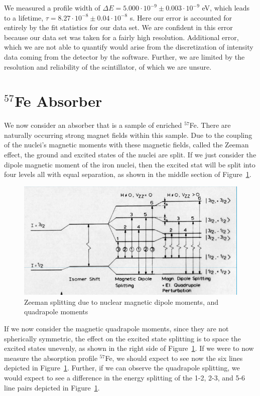 \documentclass[paper=a4, fontsize=11pt, abstract=on]{scrartcl} %
\numberwithin{equation}{section}
\numberwithin{figure}{section}
\numberwithin{table}{section}
\begin{document}
We measured a profile width of $\Delta E = 5.000 \cdot 10^{-9} \pm 0.003 \cdot 10^{-9}$ eV, which
leads to a lifetime, $\tau = 8.27 \cdot 10^{-8} \pm 0.04\cdot 10^{-8}$
s. Here our error is accounted for entirely by the fit statistics for
our data set. We are confident in this error because our data set was
taken for a fairly high resolution. Additional error, which we are not
able to quantify would arise from the discretization of intensity data
coming from the detector by the software. Further, we are limited by
the resolution and reliability of the scintillator, of which we are unsure. 


\section{$^{57}$Fe Absorber}
\label{sec:iron}

We now consider an absorber that is a sample of enriched
$^{57}$Fe. There are naturally occurring strong magnet fields within
this sample. Due to the coupling of the nuclei's magnetic moments with
these magnetic fields, called the Zeeman effect, the ground and
excited states of the nuclei are split. If we just consider the dipole
magnetic moment of the iron nuclei, then the excited stat will be
split into four levels all with equal separation, as shown in the
middle section of Figure~\ref{fig:dipsplit}.

\begin{figure}[h]
  \centering
  \includegraphics[width=.65\textwidth]{splits}
  \caption{Zeeman splitting due to nuclear magnetic dipole moments,
    and quadrapole moments \cite{art:slides}} 
  \label{fig:dipsplit}
\end{figure}

\vline

If we now consider the magnetic quadrapole moments, since they are not
spherically symmetric, the effect on the excited state splitting is to
space the excited states unevenly, as shown in the right side of
Figure~\ref{fig:dipsplit}. If we were to now measure the absorption
profile $^{57}$Fe, we should expect to see now the six lines depicted
in Figure~\ref{fig:dipsplit}. Further, if we can observe the
quadrapole splitting, we would expect to see a difference in the
energy splitting of the 1-2, 2-3, and 5-6 line pairs depicted in Figure~\ref{fig:dipsplit}.
\end{document}

